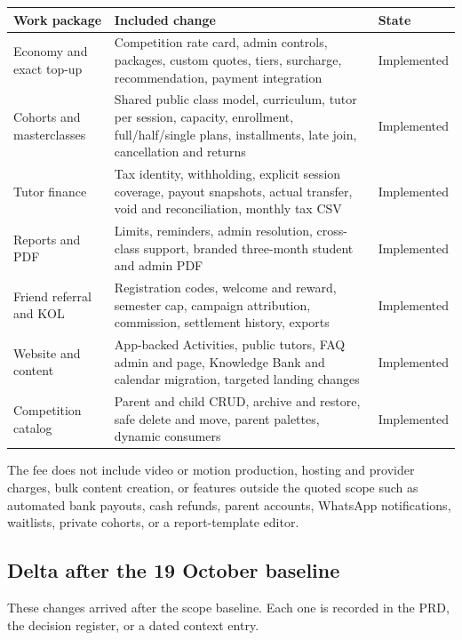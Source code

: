 \documentclass[11pt,a4paper]{article}
\begin{document}
\begin{tabular}{@{}L{3.8cm}L{8.2cm}L{3.0cm}@{}}
\toprule
\textbf{Work package} & \textbf{Included change} & \textbf{State} \\
\midrule
Economy and exact top-up & Competition rate card, admin controls, packages, custom quotes, tiers, surcharge, recommendation, payment integration & Implemented \\
Cohorts and masterclasses & Shared public class model, curriculum, tutor per session, capacity, enrollment, full/half/single plans, installments, late join, cancellation and returns & Implemented \\
Tutor finance & Tax identity, withholding, explicit session coverage, payout snapshots, actual transfer, void and reconciliation, monthly tax CSV & Implemented \\
Reports and PDF & Limits, reminders, admin resolution, cross-class support, branded three-month student and admin PDF & Implemented \\
Friend referral and KOL & Registration codes, welcome and reward, semester cap, campaign attribution, commission, settlement history, exports & Implemented \\
Website and content & App-backed Activities, public tutors, FAQ admin and page, Knowledge Bank and calendar migration, targeted landing changes & Implemented \\
Competition catalog & Parent and child CRUD, archive and restore, safe delete and move, parent palettes, dynamic consumers & Implemented \\
\bottomrule
\end{tabular}

The fee does not include video or motion production, hosting and provider charges, bulk content creation, or features outside the quoted scope such as automated bank payouts, cash refunds, parent accounts, WhatsApp notifications, waitlists, private cohorts, or a report-template editor.

\subsection{Delta after the 19 October baseline}

These changes arrived after the scope baseline. Each one is recorded in the PRD, the decision register, or a dated context entry.
\end{document}
